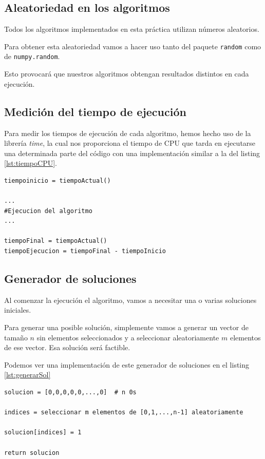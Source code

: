 \subsection{Aleatoriedad en los algoritmos}

Todos los algoritmos implementados en esta práctica utilizan números aleatorios.

Para obtener esta aleatoriedad vamos a hacer uso tanto del paquete \texttt{random} como de \texttt{numpy.random}.

Esto provocará que nuestros algoritmos obtengan resultados distintos en cada ejecución.

\subsection{Medición del tiempo de ejecución}

Para medir los tiempos de ejecución de cada algoritmo, hemos hecho uso de la librería \textit{time}, la cual nos proporciona el tiempo de CPU que tarda en ejecutarse una determinada parte del código con una implementación similar a la del listing \ref{lst:tiempoCPU}.

\begin{lstlisting}[frame=single, caption={Tiempo de ejecución de un programa}, captionpos=b, label=lst:tiempoCPU]
tiempoinicio = tiempoActual()

...
#Ejecucion del algoritmo
...

tiempoFinal = tiempoActual()
tiempoEjecucion = tiempoFinal - tiempoInicio
\end{lstlisting}

\subsection{Generador de soluciones}

Al comenzar la ejecución el algoritmo, vamos a necesitar una o varias soluciones iniciales.

Para generar una posible solución, simplemente vamos a generar un vector de tamaño $n$ sin elementos seleccionados y a seleccionar aleatoriamente $m$ elementos de ese vector.
Esa solución será factible.

Podemos ver una implementación de este generador de soluciones en el listing \ref{lst:generarSol}

\begin{lstlisting}[frame=single, caption={Generador de soluciones}, captionpos=b, label=lst:generarSol]
solucion = [0,0,0,0,0,...,0]  # n 0s

indices = seleccionar m elementos de [0,1,...,n-1] aleatoriamente

solucion[indices] = 1

return solucion
\end{lstlisting}

